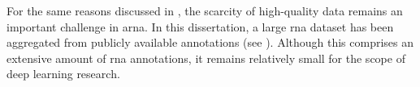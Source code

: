 

For the same reasons discussed in
, the scarcity of high-quality
data remains an important challenge in \gls{arna}. In this
dissertation, a large \gls{rna} dataset has been aggregated
from publicly available annotations (see
). Although this comprises
an extensive amount of \gls{rna} annotations, it remains
relatively small for the scope of deep learning research.

